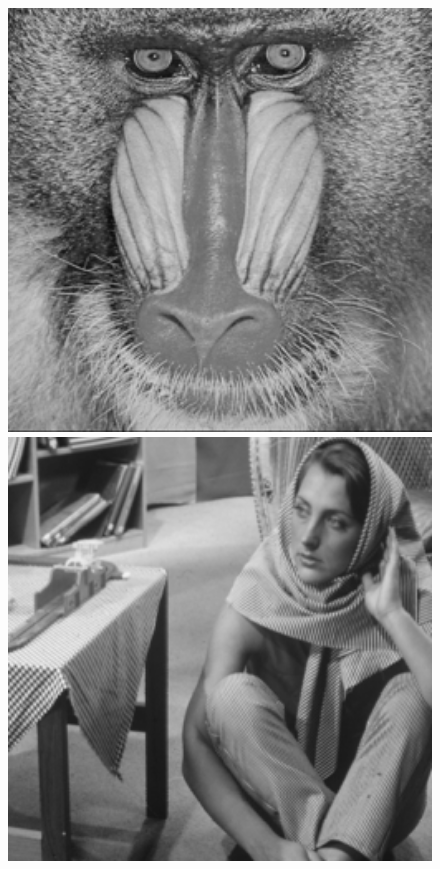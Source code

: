 \documentclass[runningheads]{llncs}
\begin{document}
\begin{figure}[t]
{\begin{minipage}{0.09\textwidth}
\end{minipage}
\begin{minipage}{0.09\textwidth}
\includegraphics[width=1.06\textwidth]{baboon.png}
\end{minipage}
\begin{minipage}{0.09\textwidth}
\includegraphics[width=1.06\textwidth]{barbara.png}

\end{minipage}}
\end{figure}
\end{document}

